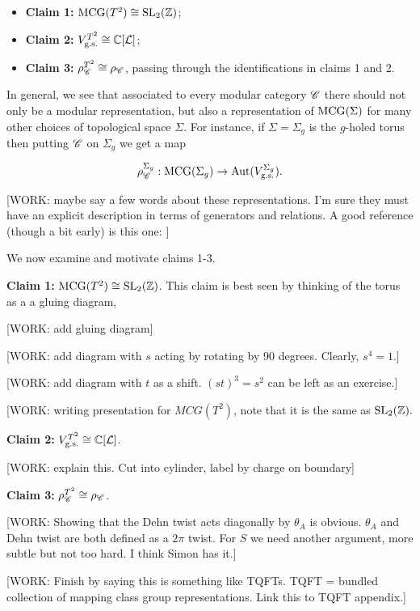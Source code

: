 \begin{itemize}
\item \textbf{Claim 1:} $\operatorname{MCG}(T^2)\cong \operatorname{SL}_2(\mathbb{Z})$;

\item \textbf{Claim 2:} $V_{\text{g.s.}}^{T^2}\cong \mathbb{C}[\mathcal{L}]$;

\item \textbf{Claim 3:} $\rho_{\mathscr{C}}^{T^2}\cong \rho_{\mathscr{C}}$, passing through the identifications in claims 1 and 2.
\end{itemize}

In general, we see that associated to every modular category $\mathscr{C}$ there should not only be a modular representation, but also a representation of $\operatorname{MCG}(\Sigma)$ for many other choices of topological space $\Sigma$. For instance, if $\Sigma=\Sigma_g$ is the $g$-holed torus then putting $\mathscr{C}$ on $\Sigma_g$ we get a map

$$\rho_{\mathscr{C}}^{\Sigma_g}:\operatorname{MCG}(\Sigma_g)\xrightarrow{}\operatorname{Aut}(V_{\text{g.s.}}^{\Sigma_g}).$$

[WORK: maybe say a few words about these representations. I'm sure they must have an explicit description in terms of generators and relations. A good reference (though a bit early) is this one: \cite{lyubashenko1995invariants}]

We now examine and motivate claims 1-3.

\textbf{Claim 1:} $\operatorname{MCG}(T^2)\cong \operatorname{SL}_2(\mathbb{Z})$. This claim is best seen by thinking of the torus as a a gluing diagram,

[WORK: add gluing diagram]

[WORK: add diagram with $s$ acting by rotating by 90 degrees. Clearly, $s^4=1$.]

[WORK: add diagram with $t$ as a shift. $(st)^3=s^2$ can be left as an exercise.]

[WORK: writing presentation for $MCG(T^2)$, note that it is the same as $\operatorname{SL}_2(\mathbb{Z}).$

\textbf{Claim 2:} $V_{\text{g.s.}}^{T^2}\cong \mathbb{C}[\mathcal{L}]$.

[WORK: explain this. Cut into cylinder, label by charge on boundary]

\textbf{Claim 3:} $\rho_{\mathscr{C}}^{T^2}\cong \rho_{\mathscr{C}}$.

[WORK: Showing that the Dehn twist acts diagonally by $\theta_A$ is obvious. $\theta_A$ and Dehn twist are both defined as a $2\pi$ twist. For $S$ we need another argument, more subtle but not too hard. I think Simon has it.]


[WORK: Finish by saying this is something like TQFTs. TQFT = bundled collection of mapping class group representations. Link this to TQFT appendix.]


